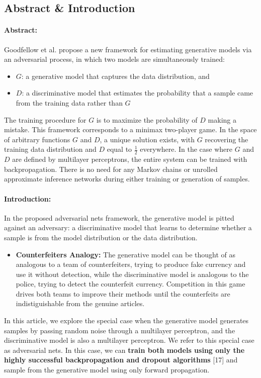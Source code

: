 \subsection*{Abstract \& Introduction}

\paragraph*{Abstract: } Goodfellow et al. propose a new framework for estimating generative models via an adversarial process, in which two models are simultaneously trained:
\begin{itemize}
\item
	$G$: a generative model that captures the data distribution, and
\item
	$D$: a discriminative model that estimates the probability that a sample came from the training data rather than $G$
\end{itemize}
The training procedure for $G$ is to maximize the probability of $D$ making a mistake. This framework corresponds to a minimax two-player game. In the space of arbitrary functions $G$ and $D$, a unique solution exists, with $G$ recovering the training data distribution and $D$ equal to $\frac{1}{2}$ everywhere. In the case where $G$ and $D$ are defined by multilayer perceptrons, the entire system can be trained with backpropagation. There is no need for any Markov chains or unrolled approximate inference networks during either training or generation of samples.


\paragraph*{Introduction: }

In the proposed adversarial nets framework, the generative model is pitted against an adversary: a discriminative model that learns to determine whether a sample is from the model distribution or the data distribution.
\begin{itemize}
\item \textbf{Counterfeiters Analogy: } The generative model can be thought of as analogous to a team of counterfeiters, trying to produce fake currency and use it without detection, while the discriminative model is analogous to the police, trying to detect the counterfeit currency. Competition in this game drives both teams to improve their methods until the counterfeits are indistiguishable from the genuine articles.
\end{itemize}
In this article, we explore the special case when the generative model generates samples by passing random noise through a multilayer perceptron, and the discriminative model is also a multilayer perceptron. We refer to this special case as adversarial nets. In this case, we can \textbf{train both models using only the highly successful backpropagation and dropout algorithms} [17] and sample from the generative model using only forward propagation.

